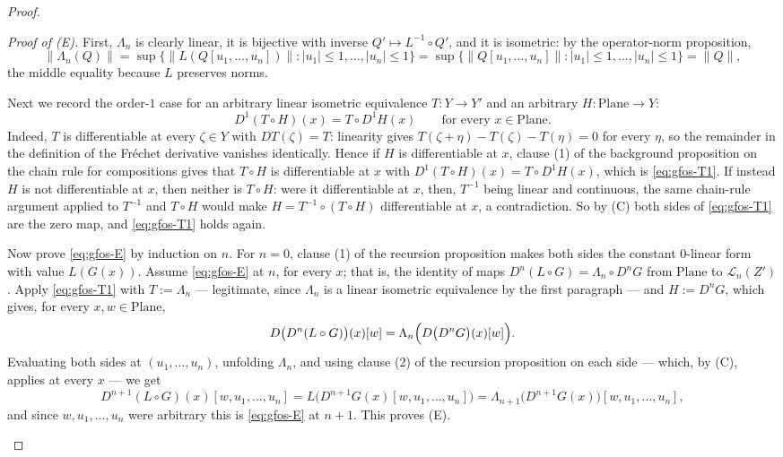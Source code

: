 \begin{proof}
\begin{itemize}
\emph{Proof of (E).}  First, $\Lambda_n$ is clearly linear, it is bijective with inverse
$Q'\mapsto L^{-1}\circ Q'$, and it is isometric: by the operator-norm proposition,
\[
  \lVert\Lambda_n(Q)\rVert
  =\sup\bigl\{\lVert L(Q[u_1,\ldots,u_n])\rVert:\lvert u_1\rvert\le1,\ldots,\lvert
    u_n\rvert\le1\bigr\}
  =\sup\bigl\{\lVert Q[u_1,\ldots,u_n]\rVert:\lvert u_1\rvert\le1,\ldots,\lvert
    u_n\rvert\le1\bigr\}
  =\lVert Q\rVert ,
\]
the middle equality because $L$ preserves norms.

Next we record the order-$1$ case for an arbitrary linear isometric equivalence
$T\colon Y\to Y'$ and an arbitrary $H\colon\mathrm{Plane}\to Y$:
\begin{equation}\label{eq:gfos-T1}
  D^{1}(T\circ H)(x)=T\circ D^{1}H(x)\qquad\text{for every }x\in\mathrm{Plane}.
\end{equation}
Indeed, $T$ is differentiable at every $\zeta\in Y$ with $DT(\zeta)=T$: linearity gives
$T(\zeta+\eta)-T(\zeta)-T(\eta)=0$ for every $\eta$, so the remainder in the definition of the
Fr\'echet derivative vanishes identically.  Hence if $H$ is differentiable at $x$, clause (1) of
the background proposition on the chain rule for compositions gives that $T\circ H$ is
differentiable at $x$ with $D^{1}(T\circ H)(x)=T\circ D^{1}H(x)$, which is
\eqref{eq:gfos-T1}.  If instead $H$ is not differentiable at $x$, then neither is $T\circ H$:
were it differentiable at $x$, then, $T^{-1}$ being linear and continuous, the same chain-rule
argument applied to $T^{-1}$ and $T\circ H$ would make $H=T^{-1}\circ(T\circ H)$ differentiable
at $x$, a contradiction.  So by (C) both sides of \eqref{eq:gfos-T1} are the zero map, and
\eqref{eq:gfos-T1} holds again.

Now prove \eqref{eq:gfos-E} by induction on $n$.  For $n=0$, clause (1) of the recursion
proposition makes both sides the constant $0$-linear form with value $L(G(x))$.  Assume
\eqref{eq:gfos-E} at $n$, for every $x$; that is, the identity of maps
$D^{n}(L\circ G)=\Lambda_n\circ D^{n}G$ from $\mathrm{Plane}$ to $\mathcal{L}_n(Z')$.  Apply
\eqref{eq:gfos-T1} with $T:=\Lambda_n$ --- legitimate, since $\Lambda_n$ is a linear isometric
equivalence by the first paragraph --- and $H:=D^{n}G$, which gives, for every
$x,w\in\mathrm{Plane}$,
\[
  D\bigl(D^{n}(L\circ G)\bigr)(x)[w]
  =\Lambda_n\Bigl(D\bigl(D^{n}G\bigr)(x)[w]\Bigr).
\]
Evaluating both sides at $(u_1,\ldots,u_n)$, unfolding $\Lambda_n$, and using clause (2) of the
recursion proposition on each side --- which, by (C), applies at every $x$ --- we get
\[
  D^{n+1}(L\circ G)(x)[w,u_1,\ldots,u_n]
  =L\bigl(D^{n+1}G(x)[w,u_1,\ldots,u_n]\bigr)
  =\Lambda_{n+1}\bigl(D^{n+1}G(x)\bigr)[w,u_1,\ldots,u_n],
\]
and since $w,u_1,\ldots,u_n$ were arbitrary this is \eqref{eq:gfos-E} at $n+1$.  This proves (E).
\end{itemize}


\end{proof}
